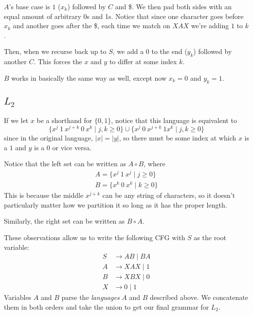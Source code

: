 \documentclass[12pt]{article}
\begin{document}
$A$'s base case is $1$ ($x_k$) followed by $C$ and \$.
We then pad both sides with an equal amount of arbitrary 0s and 1s.
Notice that since one character goes before $x_k$ and another goes after the \$,
each time we match on $XAX$ we're adding $1$ to $k$.

Then, when we recurse back up to $S$, we add a 0 to the end ($y_k$)
followed by another $C$.
This forces the $x$ and $y$ to differ at some index $k$.

$B$ works in basically the same way as well, except now $x_k=0$ and $y_k=1$.

\pagebreak

\subsection{\texorpdfstring{$L_2$}{L\_2}}

If we let $x$ be a shorthand for $\{0, 1\}$, notice that this language is equivalent to
\[\{x^j\ 1\ x^{j+k}\ 0\ x^k \mid j, k \ge 0\} \cup \{x^j\ 0\ x^{j+k}\ 1x^k \mid j, k \ge 0\}\]
since in the original language, $|x|=|y|$, so there must be some index
at which $x$ is a $1$ and $y$ is a $0$ or vice versa.

Notice that the left set can be written as $A \circ B$, where
\begin{gather*}
    A=\{x^j\ 1\ x^j \mid j \ge 0\} \\
    B=\{x^k\ 0\ x^k \mid k \ge 0\}
\end{gather*}
This is because the middle $x^{j+k}$ can be any string of characters,
so it doesn't particularly matter how we partition it so long as it has the proper length.

Similarly, the right set can be written as $B \circ A$.

These observations allow us to write the following CFG with $S$ as the root variable:
\begin{align*}
    S & \to AB \mid BA \\
    A & \to XAX \mid 1 \\
    B & \to XBX \mid 0 \\
    X & \to 0 \mid 1
\end{align*}
Variables $A$ and $B$ parse the \textit{languages} $A$ and $B$ described above.
We concatenate them in both orders and take the union to get our final
grammar for $L_2$.
\end{document}
